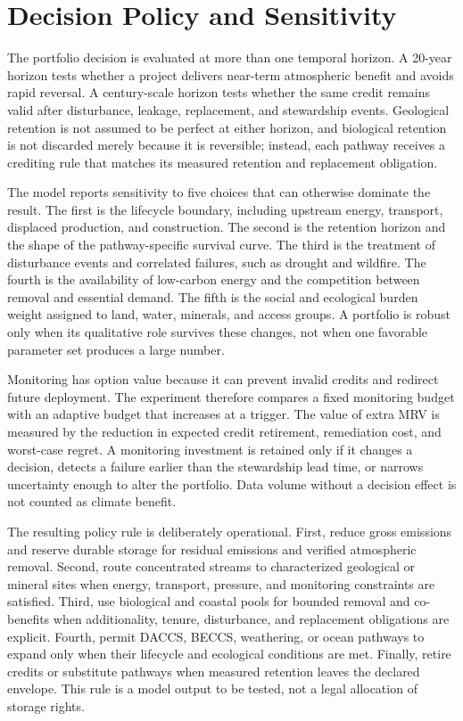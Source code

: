 \documentclass[conference]{IEEEtran}
\begin{document}
\section{Decision Policy and Sensitivity}
The portfolio decision is evaluated at more than one temporal horizon. A 20-year horizon tests whether a project delivers near-term atmospheric benefit and avoids rapid reversal. A century-scale horizon tests whether the same credit remains valid after disturbance, leakage, replacement, and stewardship events. Geological retention is not assumed to be perfect at either horizon, and biological retention is not discarded merely because it is reversible; instead, each pathway receives a crediting rule that matches its measured retention and replacement obligation.

The model reports sensitivity to five choices that can otherwise dominate the result. The first is the lifecycle boundary, including upstream energy, transport, displaced production, and construction. The second is the retention horizon and the shape of the pathway-specific survival curve. The third is the treatment of disturbance events and correlated failures, such as drought and wildfire. The fourth is the availability of low-carbon energy and the competition between removal and essential demand. The fifth is the social and ecological burden weight assigned to land, water, minerals, and access groups. A portfolio is robust only when its qualitative role survives these changes, not when one favorable parameter set produces a large number.

Monitoring has option value because it can prevent invalid credits and redirect future deployment. The experiment therefore compares a fixed monitoring budget with an adaptive budget that increases at a trigger. The value of extra MRV is measured by the reduction in expected credit retirement, remediation cost, and worst-case regret. A monitoring investment is retained only if it changes a decision, detects a failure earlier than the stewardship lead time, or narrows uncertainty enough to alter the portfolio. Data volume without a decision effect is not counted as climate benefit.

The resulting policy rule is deliberately operational. First, reduce gross emissions and reserve durable storage for residual emissions and verified atmospheric removal. Second, route concentrated streams to characterized geological or mineral sites when energy, transport, pressure, and monitoring constraints are satisfied. Third, use biological and coastal pools for bounded removal and co-benefits when additionality, tenure, disturbance, and replacement obligations are explicit. Fourth, permit DACCS, BECCS, weathering, or ocean pathways to expand only when their lifecycle and ecological conditions are met. Finally, retire credits or substitute pathways when measured retention leaves the declared envelope. This rule is a model output to be tested, not a legal allocation of storage rights.
\end{document}
